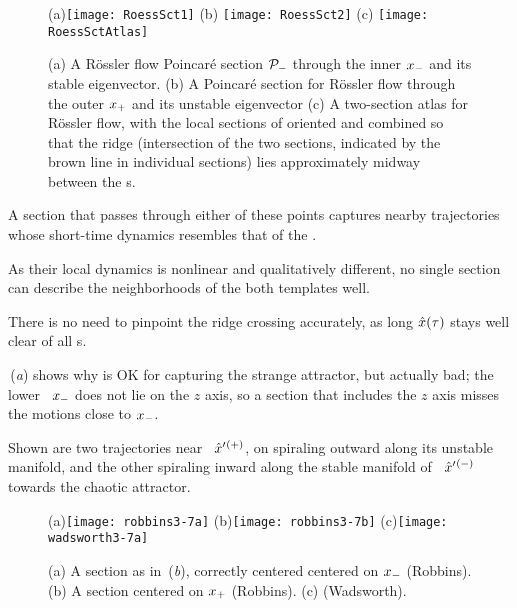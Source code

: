 \begin{figure}%
\begin{center}
(a)\texttt{[image: RoessSct1]}
(b) \texttt{[image: RoessSct2]}
(c) \texttt{[image: RoessSctAtlas]}
\end{center}
  \caption{\label{fig:RoessSct1}
(a) A R\"ossler flow Poincar\'e section ${\cal P}_{-}$ through the inner
  {\eqv} $x_{-}$ and its stable eigenvector.
(b)
  A Poincar\'e section for R\"ossler flow
      through the
      outer
  {\eqv} $x_{+}$  and its unstable eigenvector
(c)
  A two-section atlas for R\"ossler flow, with the local sections of
   oriented and combined so that
  the ridge (intersection of the two sections, indicated by the brown
  line in individual sections) lies  approximately midway between the
  \template s.
}
\end{figure}

 A
section that passes through either of these points captures nearby
trajectories whose short-time dynamics resembles that of the \template.

 As their local
dynamics is nonlinear and qualitatively different, no single section can
describe the neighborhoods of the both templates well.

There is
no need to pinpoint the ridge crossing accurately, as long $\hat{x}(\tau)$
stays well clear of all \chartBord s.

\,({\it a}) shows why  is OK for
capturing the strange attractor, but actually bad; the lower \eqv\
$x_{-}$ does not lie on the $z$ axis, so a section that includes the
$z$ axis misses the motions close to  $x_{-}$.

Shown are two trajectories near
\eqv\ ${\hat{x}'}{}^{(+)}$, on spiraling outward along its unstable
manifold, and the other spiraling inward along the stable manifold of
\eqv\ ${\hat{x}'}{}^{(-)}$ towards the chaotic attractor.


\begin{figure}
   \centering
(a)\texttt{[image: robbins3-7a]}
(b)\texttt{[image: robbins3-7b]}
(c)\texttt{[image: wadsworth3-7a]}
   \caption{\label{fig:robbins3-7}
    (a)
A section as in \,({\it b}), correctly centered
centered on $x_{-}$ (Robbins).
    (b)
A section centered on $x_{+}$ (Robbins).
    (c)
(Wadsworth).
}
\end{figure}

